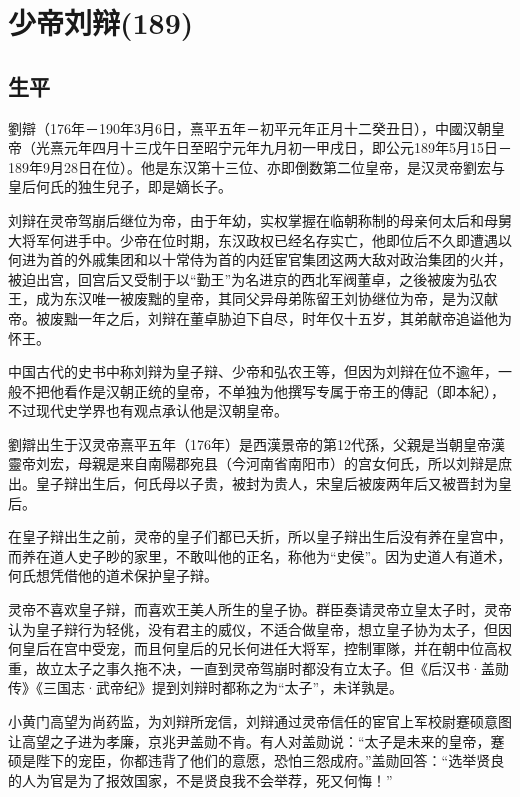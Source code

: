 
\section{少帝刘辩\tiny(189)}

\subsection{生平}

劉辯（176年－190年3月6日，熹平五年－初平元年正月十二癸丑日），中國汉朝皇帝（光熹元年四月十三戊午日至昭宁元年九月初一甲戌日，即公元189年5月15日－189年9月28日在位）。他是东汉第十三位、亦即倒数第二位皇帝，是汉灵帝劉宏与皇后何氏的独生兒子，即是嫡长子。

刘辩在灵帝驾崩后继位为帝，由于年幼，实权掌握在临朝称制的母亲何太后和母舅大将军何进手中。少帝在位时期，东汉政权已经名存实亡，他即位后不久即遭遇以何进为首的外戚集团和以十常侍为首的内廷宦官集团这两大敌对政治集团的火并，被迫出宫，回宫后又受制于以“勤王”为名进京的西北军阀董卓，之後被废为弘农王，成为东汉唯一被废黜的皇帝，其同父异母弟陈留王刘协继位为帝，是为汉献帝。被废黜一年之后，刘辩在董卓胁迫下自尽，时年仅十五岁，其弟献帝追谥他为怀王。

中国古代的史书中称刘辩为皇子辩、少帝和弘农王等，但因为刘辩在位不逾年，一般不把他看作是汉朝正统的皇帝，不单独为他撰写专属于帝王的傳記（即本紀），不过现代史学界也有观点承认他是汉朝皇帝。

劉辯出生于汉灵帝熹平五年（176年）是西漢景帝的第12代孫，父親是当朝皇帝漢靈帝刘宏，母親是来自南陽郡宛县（今河南省南阳市）的宫女何氏，所以刘辩是庶出。皇子辩出生后，何氏母以子贵，被封为贵人，宋皇后被废两年后又被晋封为皇后。

在皇子辩出生之前，灵帝的皇子们都已夭折，所以皇子辩出生后没有养在皇宫中，而养在道人史子眇的家里，不敢叫他的正名，称他为“史侯”。因为史道人有道术，何氏想凭借他的道术保护皇子辩。

灵帝不喜欢皇子辩，而喜欢王美人所生的皇子协。群臣奏请灵帝立皇太子时，灵帝认为皇子辩行为轻佻，没有君主的威仪，不适合做皇帝，想立皇子协为太子，但因何皇后在宫中受宠，而且何皇后的兄长何进任大将军，控制軍隊，并在朝中位高权重，故立太子之事久拖不决，一直到灵帝驾崩时都没有立太子。但《后汉书·盖勋传》《三国志·武帝纪》提到刘辩时都称之为“太子”，未详孰是。

小黄门高望为尚药监，为刘辩所宠信，刘辩通过灵帝信任的宦官上军校尉蹇硕意图让高望之子进为孝廉，京兆尹盖勋不肯。有人对盖勋说：“太子是未来的皇帝，蹇硕是陛下的宠臣，你都违背了他们的意愿，恐怕三怨成府。”盖勋回答：“选举贤良的人为官是为了报效国家，不是贤良我不会举荐，死又何悔！”


